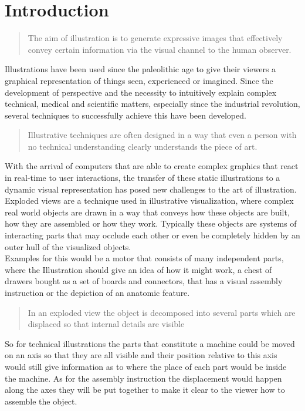 \chapter{Introduction}

\begin{quote}
The aim of illustration is to generate expressive images that effectively convey certain information via the visual channel to the human observer.\cite{Viola-05-Smart}
\end{quote}

Illustrations have been used since the paleolithic age\cite{Viola-05-Smart} to give their viewers a graphical representation of things seen, experienced or imagined\cite{misc:WikiEnVIs}. Since the development of perspective and the necessity to intuitively explain complex technical, medical and scientific matters, especially since the industrial revolution, several techniques to successfully achieve this have been developed.
\begin{quote}
Illustrative techniques are often designed in a way that even a person with no technical understanding clearly understands the piece of art.\cite{Viola-05-Smart}
\end{quote}
With the arrival of computers that are able to create complex graphics that react in real-time to user interactions, the transfer of these static illustrations to a dynamic visual representation has posed new challenges to the art of illustration.
Exploded views are a technique used in illustrative visualization, where complex real world objects are drawn in a way that conveys how these objects are built, how they are assembled or how they work. Typically these objects are systems of interacting parts that may occlude each other or even be completely hidden by an outer hull of the visualized objects.\\
Examples for this would be a motor that consists of many independent parts, where the Illustration should give an idea of how it might work, a chest of drawers bought as a set of boards and connectors, that has a visual assembly instruction or the depiction of an anatomic feature.\\
\begin{quote}
In an exploded view the object is decomposed into several parts which are displaced so that internal details are visible \cite{proc:bruckner-2006-EVV}
\end{quote}
So for technical illustrations the parts that constitute a machine could be moved on an axis so that they are all visible and their position relative to this axis would still give information as to where the place of each part would be inside the machine. As for the assembly instruction the displacement would happen along the axes they will be put together to make it clear to the viewer how to assemble the object.\\
